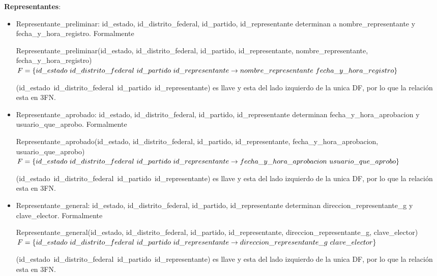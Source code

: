 \documentclass[a4paper,twoside,11pt]{article}
\begin{document}
\textbf{Representantes}:
\begin{itemize}
  \item Representante\_preliminar: id\_estado, id\_distrito\_federal, id\_partido, id\_representante determinan
        a nombre\_representante y fecha\_y\_hora\_registro. Formalmente

        Representante\_preliminar(id\_estado, id\_distrito\_federal, id\_partido, id\_representante,
        nombre\_representante, fecha\_y\_hora\_registro)\\
        $F=\{id\_estado~id\_distrito\_federal~id\_partido~id\_representante\rightarrow\\
        nombre\_representante~fecha\_y\_hora\_registro\}$

        (id\_estado~id\_distrito\_federal~id\_partido~id\_representante) es llave y esta del lado izquierdo de la unica DF,
        por lo que la relación esta en 3FN.

  \item Representante\_aprobado: id\_estado, id\_distrito\_federal, id\_partido, id\_representante determinan
        fecha\_y\_hora\_aprobacion y usuario\_que\_aprobo. Formalmente

        Representante\_aprobado(id\_estado, id\_distrito\_federal, id\_partido, id\_representante,
        fecha\_y\_hora\_aprobacion, usuario\_que\_aprobo)\\
        $F=\{id\_estado~id\_distrito\_federal~id\_partido~id\_representante\rightarrow\\
        fecha\_y\_hora\_aprobacion~usuario\_que\_aprobo\}$

        (id\_estado~id\_distrito\_federal~id\_partido~id\_representante) es llave y esta del lado izquierdo de la unica DF,
        por lo que la relación esta en 3FN.

  \item Representante\_general: id\_estado, id\_distrito\_federal, id\_partido, id\_representante determinan
        direccion\_representante\_g y clave\_elector. Formalmente

        Representante\_general(id\_estado, id\_distrito\_federal, id\_partido, id\_representante,
        direccion\_representante\_g, clave\_elector)\\
        $F=\{id\_estado~id\_distrito\_federal~id\_partido~id\_representante\rightarrow\\
        direccion\_representante\_g~clave\_elector\}$

        (id\_estado~id\_distrito\_federal~id\_partido~id\_representante) es llave y esta del lado izquierdo de la unica DF,
        por lo que la relación esta en 3FN.


\end{itemize}
\end{document}
